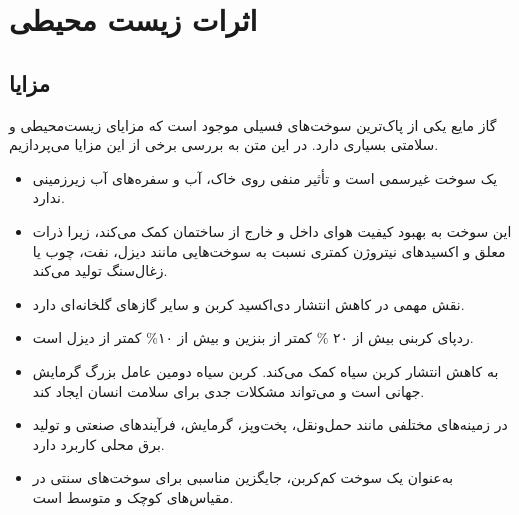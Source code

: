 \section{اثرات زیست محیطی}
	\subsection{مزایا}
	گاز مایع  یکی از پاک‌ترین سوخت‌های فسیلی موجود است که مزایای زیست‌محیطی و سلامتی بسیاری دارد. در این متن به بررسی برخی از این مزایا می‌پردازیم.
	\cite{Newes2023}
	\begin{itemize}
		\item {} یک سوخت غیرسمی است و تأثیر منفی روی خاک، آب و سفره‌های آب زیرزمینی ندارد.
		\item این سوخت به بهبود کیفیت هوای داخل و خارج از ساختمان کمک می‌کند، زیرا ذرات معلق و اکسیدهای نیتروژن  کمتری نسبت به سوخت‌هایی مانند دیزل، نفت، چوب یا زغال‌سنگ تولید می‌کند.
		\item {} نقش مهمی در کاهش انتشار دی‌اکسید کربن و سایر گازهای گلخانه‌ای دارد.
		\item ردپای کربنی  بیش از ۲۰ $\%$ کمتر از بنزین و بیش از ۱۰$\%$ کمتر از دیزل است.
		\item {} به کاهش انتشار کربن سیاه کمک می‌کند. کربن سیاه دومین عامل بزرگ گرمایش جهانی است و می‌تواند مشکلات جدی برای سلامت انسان ایجاد کند.
		\item {} در زمینه‌های مختلفی مانند حمل‌ونقل، پخت‌وپز، گرمایش، فرآیندهای صنعتی و تولید برق محلی کاربرد دارد.
		\item به‌عنوان یک سوخت کم‌کربن، جایگزین مناسبی برای سوخت‌های سنتی در مقیاس‌های کوچک و متوسط است.
	\end{itemize}
